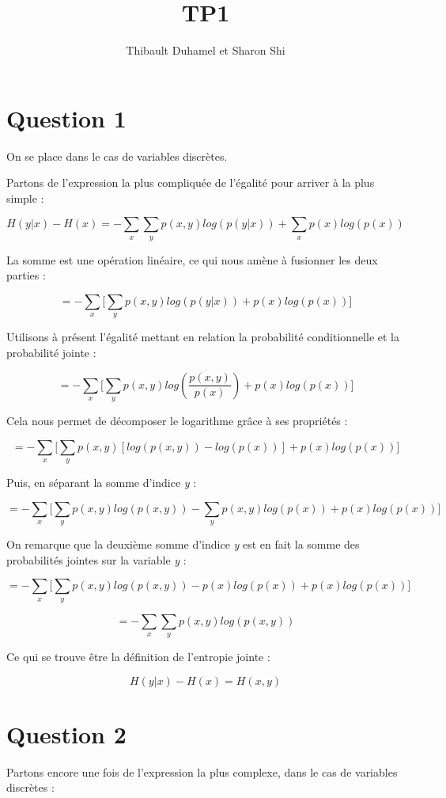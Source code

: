 \documentclass{article}
\title{TP1}
\author{Thibault Duhamel et Sharon Shi }
\begin{document}
\maketitle

\section*{Question 1}

On se place dans le cas de variables discrètes.

Partons de l'expression la plus compliquée de l'égalité pour arriver à la plus simple :

$$H(y|x) - H(x) = - \sum_{x}{\sum_{y}{p(x,y)log(p(y|x))}} + \sum_{x}{p(x)log(p(x))}$$

La somme est une opération linéaire, ce qui nous amène à fusionner les deux parties :

$$ = - \sum_{x}{\Big[\sum_{y}{p(x,y)log(p(y|x))} + p(x)log(p(x))\Big]}$$

Utilisons à présent l'égalité mettant en relation la probabilité conditionnelle et la probabilité jointe :

$$ = - \sum_{x}{\Big[\sum_{y}{p(x,y)log(\frac{p(x,y)}{p(x)})} + p(x)log(p(x))\Big]}$$

Cela nous permet de décomposer le logarithme grâce à ses propriétés :

$$ = - \sum_{x}{\Big[\sum_{y}{p(x,y)[log(p(x,y))-log(p(x))]} + p(x)log(p(x))\Big]}$$

Puis, en séparant la somme d'indice \textit{y} :

$$ = - \sum_{x}{\Big[\sum_{y}{p(x,y)log(p(x,y))}-\sum_{y}{p(x,y)log(p(x))} + p(x)log(p(x))\Big]}$$

On remarque que la deuxième somme d'indice \textit{y} est en fait la somme des probabilités jointes sur la variable \textit{y} :

$$ = - \sum_{x}{\Big[\sum_{y}{p(x,y)log(p(x,y))}-p(x)log(p(x)) + p(x)log(p(x))\Big]}$$

$$ = - \sum_{x}{\sum_{y}{p(x,y)log(p(x,y))}}$$

Ce qui se trouve être la définition de l'entropie jointe :

$$\boxed{H(y|x) - H(x) = H(x,y)}$$



\section*{Question 2}

Partons encore une fois de l'expression la plus complexe, dans le cas de variables discrètes :
\end{document}
